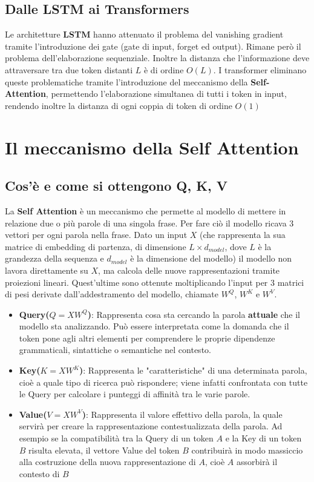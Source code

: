 \documentclass{article}
\begin{document}
\subsection{Dalle LSTM ai Transformers}
Le architetture \textbf{LSTM} hanno attenuato il problema del vanishing gradient tramite l'introduzione dei gate (gate di input, forget ed output).
Rimane però il problema dell'elaborazione sequenziale.
Inoltre la distanza che l'informazione deve attraversare tra due token distanti $L$ è di ordine $O(L)$.
I transformer eliminano queste problematiche tramite l'introduzione del meccanismo della \textbf{Self-Attention}, permettendo l'elaborazione simultanea di tutti i token in input, rendendo inoltre la distanza di ogni coppia di token di ordine $O(1)$


\section{Il meccanismo della Self Attention}
\subsection{Cos'è e come si ottengono Q, K, V}
\label{sec:vettori}
La \textbf{Self Attention} è un meccanismo che permette al modello di mettere in relazione due o più parole di una singola frase.
Per fare ciò il modello ricava 3 vettori per ogni parola nella frase.
Dato un input $X$ (che rappresenta la sua matrice di embedding di partenza, di dimensione
$L \times d_{model}$, dove $L$ è la grandezza della sequenza e $d_{model}$ è la dimensione del modello)
il modello non lavora direttamente su $X$, ma calcola delle nuove rappresentazioni tramite proiezioni lineari.
Quest'ultime sono ottenute moltiplicando l'input per 3 matrici di pesi derivate dall'addestramento del modello, chiamate $W^Q$, $W^K$ e $W^V$.
\begin{itemize}
    \item \textbf{Query($Q=XW^Q$)}: Rappresenta cosa sta cercando la parola \textbf{attuale} che il modello sta analizzando. Può essere interpretata come la domanda che il token pone agli altri elementi per comprendere le proprie dipendenze grammaticali, sintattiche o semantiche nel contesto.
    \item \textbf{Key($K=XW^K$)}: Rappresenta le "caratteristiche" di una determinata parola, cioè a quale tipo di ricerca può rispondere; viene infatti confrontata con tutte le Query per calcolare i punteggi di affinità tra le varie parole.
    \item \textbf{Value($V=XW^V$)}: Rappresenta il valore effettivo della parola, la quale servirà per creare la rappresentazione contestualizzata della parola. Ad esempio se la compatibilità tra la Query di un token $A$ e la Key di un token $B$ risulta elevata, il vettore Value del token $B$ contribuirà in modo massiccio alla costruzione della nuova rappresentazione di $A$, cioè $A$ assorbirà il contesto di $B$
\end{itemize}
\end{document}
